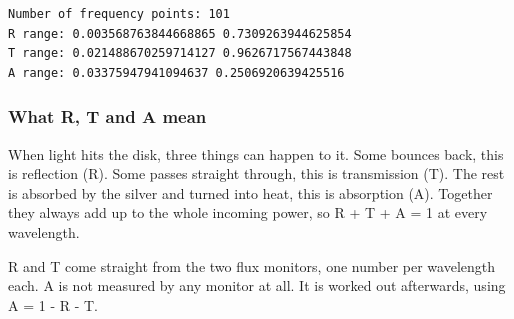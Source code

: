\documentclass[11pt]{article}
\begin{document}
    \begin{Verbatim}[commandchars=\\\{\}]
Number of frequency points: 101
R range: 0.003568763844668865 0.7309263944625854
T range: 0.021488670259714127 0.9626717567443848
A range: 0.03375947941094637 0.2506920639425516
    \end{Verbatim}

    \subsubsection{What R, T and A mean}\label{what-r-t-and-a-mean}

When light hits the disk, three things can happen to it. Some bounces
back, this is reflection (R). Some passes straight through, this is
transmission (T). The rest is absorbed by the silver and turned into
heat, this is absorption (A). Together they always add up to the whole
incoming power, so R + T + A = 1 at every wavelength.

    R and T come straight from the two flux monitors, one number per
wavelength each. A is not measured by any monitor at all. It is worked
out afterwards, using A = 1 - R - T.
\end{document}
